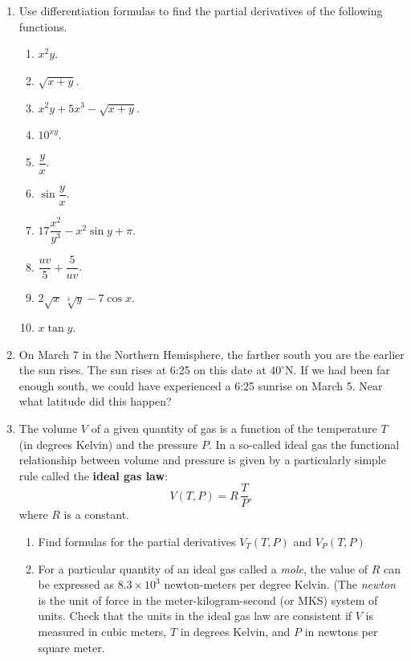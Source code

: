 \begin{enumerate}
\item Use differentiation formulas to find the partial derivatives of
the following functions.

  \begin{enumerate}
  \item $x^2 y$.

  \item $\sqrt{x + y}$.

  \item $x^2y + 5x^3 - \sqrt{x + y}$.

  \item $10^{xy}$.

  \item $\dfrac{y}{x}$.

  \item $\sin{\dfrac{y}{x}}$.

  \item $ 17 \dfrac{x^2}{y^3} - x^2 \sin{y} + \pi$.

  \item $\dfrac{uv}{5} + \dfrac{5}{uv}$.

  \item $ 2 \sqrt{x} \, \sqrt[3]{y} - 7 \cos{x}$.

  \item $x\tan{y}$.


\end{enumerate}
\item On March 7 in the Northern Hemisphere, the farther south you are
the earlier the sun rises.  The sun rises at 6:25 on this date at
$40^\circ$N.  If we had been far enough south, we could have
experienced a 6:25 sunrise on March 5.  Near what latitude did this
happen?



\item The volume $V$ of a given quantity of gas is a function of the
temperature $T$ (in degrees Kelvin) and the pressure $P$.  In a
so-called ideal gas the functional relationship between volume and
pressure is given by a particularly simple rule called the {\bf ideal
  gas law}:
	\[
V(T,P) = R \, \frac{T}{P},
\]
where $R$ is a constant.

  \begin{enumerate}
  \item Find formulas for the partial derivatives $V_T(T,P)$ and
$V_P(T,P)$


  \item For a particular quantity of an ideal gas called a {\em mole},
the value of $R$ can be expressed as $8.3 \times 10^3$ newton-meters
per degree Kelvin.  (The {\em newton} is the unit of force in the
meter-kilogram-second (or MKS) system of units. Check
that the units in the ideal gas law are consistent if $V$ is measured
in cubic meters, $T$ in degrees Kelvin, and $P$ in newtons per square
meter.



\end{enumerate}
\end{enumerate}
